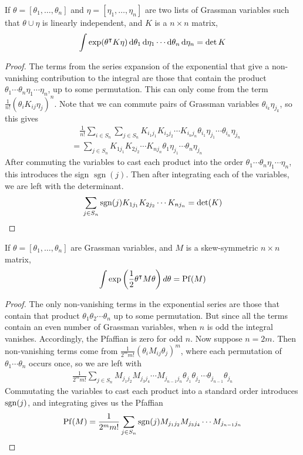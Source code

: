 \begin{lem} \label{lem:berezin_det}
	If $\theta = [\theta_1,\ldots,\theta_n]$ and $\eta=[\eta_1,\ldots,\eta_n]$
	are two lists of Grassman variables such that $\theta\cup\eta$ is linearly
	independent, and $K$ is a  $n\times n$ matrix,
	\[
	\int \exp (\theta^\intercal K \eta) 
	\odif{\theta_1}\odif{\eta_1}\cdots\odif{\theta_n}\odif{\eta_n} = \det K
	\] 
\end{lem}
\begin{proof}
	The terms from the series expansion of the exponential that give a
	non-vanishing contribution to the integral are those that contain the product
	$\theta_1\cdots\theta_n\eta_1\cdots\eta_n$, up to some permutation.
	This can only come from the term $\frac{1}{n!}(\theta_i K_{ij} \eta_j)^n$. Note that we
	can commute pairs of Grassman variables $\theta_{i_k} \eta_{j_k}$, so this gives
	\begin{align*}
	&\quad \frac{1}{n!}\sum_{i\in S_n} \sum_{j\in S_n} 
	K_{i_1j_1}K_{i_2j_2} \cdots K_{i_nj_n} 
	\theta_{i_1}\eta_{j_1}\cdots \theta_{i_n}\eta_{j_n} \\
	&= \sum_{j\in S_n} K_{1j_1}K_{2j_2} \cdots K_{nj_n} \theta_1\eta_{j_1}\cdots
	\theta_n\eta_{j_n} 
	\end{align*}
	After commuting the variables to cast each product into the order 
	$\theta_1\cdots\theta_n\eta_1\cdots\eta_{n}$, this introduces the sign
	$\operatorname{sgn}(j)$. Then after integrating each of the variables, we
	are left with the determinant. 
	\[
		\sum_{j\in S_n} \operatorname{sgn}(j) K_{1j_1}K_{2j_2} \cdots K_{nj_n} = \det(K)
	\] 
\end{proof}
\begin{lem} \label{lem:berezin_pf}
	If $\theta = [\theta_1,\ldots,\theta_n]$ are Grassman
	variables, and $M$ is a skew-symmetric  $n\times n$ matrix,
	\[
	\int \exp\paren{\frac{1}{2}\theta^{\intercal}M\theta} d\theta = \Pf(M)
	\] 
\end{lem}
\begin{proof}
	The only non-vanishing terms in the exponential series are those that
	contain that product $\theta_1\theta_2\cdots\theta_n$ up to some
	permutation. But since all the terms contain an even number of Grassman
	variables, when  $n$ is odd the integral vanishes. Accordingly, the Pfaffian
	is zero for odd $n$.
	Now suppose  $n=2m$.
	Then non-vanishing terms come from
	$\frac{1}{2^mm!}(\theta_iM_{ij}\theta_j)^m$, where each permutation of
	$\theta_1\cdots\theta_n$ occurs once, so we are left with
	\begin{align*}
		\frac{1}{2^mm!}\sum_{j\in S_n} M_{j_1j_2}M_{j_3j_4}\cdots M_{j_{n-1}j_n}
		\theta_{j_1}\theta_{j_2}\cdots \theta_{j_{n-1}}\theta_{j_n}
	\end{align*}
	Commutating the variables to cast each product into a standard order
	introduces $\operatorname{sgn}(j)$, and integrating gives us the Pfaffian
	\[
	\operatorname{Pf}(M) = \frac{1}{2^{m}m!} \sum_{j\in S_n} \operatorname{sgn}(j)
	M_{j_1j_2}M_{j_3j_4}\cdots M_{j_{n-1}j_n}
	\] 
\end{proof}
